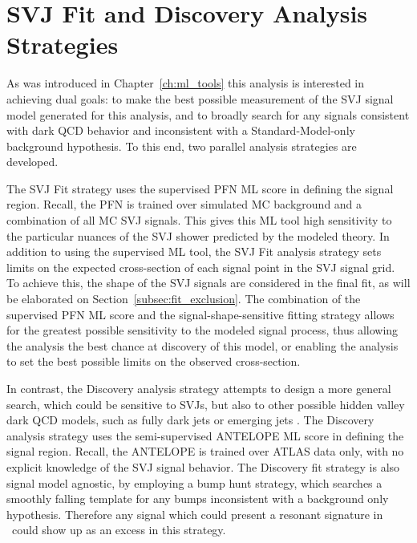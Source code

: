 

\section{SVJ Fit and Discovery Analysis Strategies}
\label{sec:strategies}
As was introduced in Chapter~\ref{ch:ml_tools} this analysis is interested in achieving dual goals: to make the best possible measurement of the SVJ signal model generated for this analysis, and to broadly search for any signals consistent with dark QCD behavior and inconsistent with a Standard-Model-only background hypothesis. To this end, two parallel analysis strategies are developed.\par

The SVJ Fit strategy uses the supervised PFN ML score in defining the signal region. Recall, the PFN is trained over simulated MC background and a combination of all MC SVJ signals. This gives this ML tool high sensitivity to the particular nuances of the SVJ shower predicted by the modeled theory. In addition to using the supervised ML tool, the SVJ Fit analysis strategy sets limits on the expected cross-section of each signal point in the SVJ signal grid. To achieve this, the shape of the SVJ signals are considered in the final fit, as will be elaborated on Section~\ref{subsec:fit_exclusion}. The combination of the supervised PFN ML score and the signal-shape-sensitive fitting strategy allows for the greatest possible sensitivity to the modeled signal process, thus allowing the analysis the best chance at discovery of this model, or enabling the analysis to set the best possible limits on the observed cross-section.\par

In contrast, the Discovery analysis strategy attempts to design a more general search, which could be sensitive to SVJs, but also to other possible hidden valley dark QCD models, such as fully dark jets or emerging jets \cite{snowmass}. The Discovery analysis strategy uses the semi-supervised ANTELOPE ML score in defining the signal region. Recall, the ANTELOPE is trained over ATLAS data only, with no explicit knowledge of the SVJ signal behavior. The Discovery fit strategy is also signal model agnostic, by employing a bump hunt \cite{bumphunt} strategy, which searches a smoothly falling template for any bumps inconsistent with a background only hypothesis. Therefore any signal which could present a resonant signature in \mt~could show up as an excess in this strategy. \par


